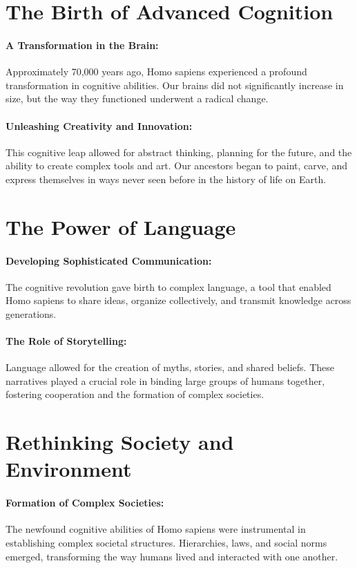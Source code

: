 \documentclass[a4paper,12pt]{book}
\begin{document}
\section*{The Birth of Advanced Cognition}

\paragraph{A Transformation in the Brain:}
Approximately 70,000 years ago, Homo sapiens experienced a profound transformation in cognitive abilities. Our brains did not significantly increase in size, but the way they functioned underwent a radical change.

\paragraph{Unleashing Creativity and Innovation:}
This cognitive leap allowed for abstract thinking, planning for the future, and the ability to create complex tools and art. Our ancestors began to paint, carve, and express themselves in ways never seen before in the history of life on Earth.

\section*{The Power of Language}

\paragraph{Developing Sophisticated Communication:}
The cognitive revolution gave birth to complex language, a tool that enabled Homo sapiens to share ideas, organize collectively, and transmit knowledge across generations.

\paragraph{The Role of Storytelling:}
Language allowed for the creation of myths, stories, and shared beliefs. These narratives played a crucial role in binding large groups of humans together, fostering cooperation and the formation of complex societies.

\section*{Rethinking Society and Environment}

\paragraph{Formation of Complex Societies:}
The newfound cognitive abilities of Homo sapiens were instrumental in establishing complex societal structures. Hierarchies, laws, and social norms emerged, transforming the way humans lived and interacted with one another.
\end{document}
